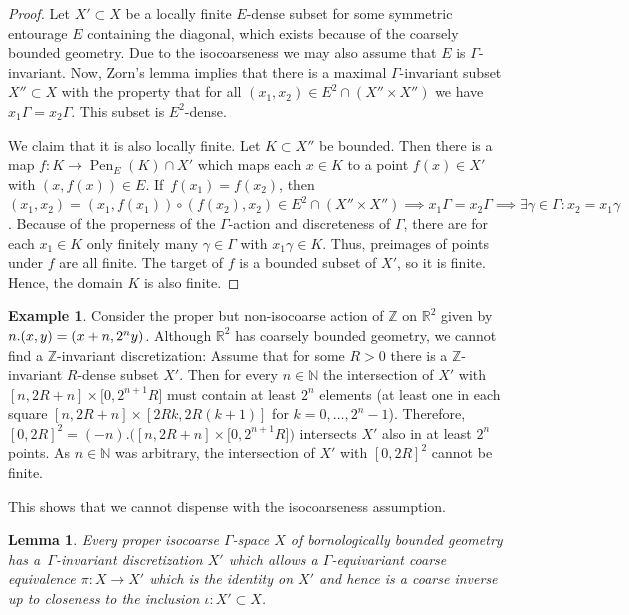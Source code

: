\documentclass[pdftex]{sigma}
\numberwithin{equation}{section}
\newtheorem{lem}[thm]{Lemma}
\theoremstyle{definition}
\newtheorem{Example}[thm]{Example}
\newcommand{\N}{\mathbb{N}}
\newcommand{\Z}{\mathbb{Z}}
\newcommand{\R}{\mathbb{R}}
\DeclareMathOperator{\Pen}{Pen}
\begin{document}
\begin{proof}
Let $X'\subset X$ be a locally finite $E$-dense subset for some symmetric entourage $E$ containing the diagonal, which exists because of the coarsely bounded geometry. Due to the isocoarseness we may also assume that $E$ is $\Gamma$-invariant. Now, Zorn's lemma implies that there is a maximal $\Gamma$-invariant subset $X''\subset X$ with the property that for all $(x_1,x_2)\in E^2\cap(X''\times X'')$ we have $x_1\Gamma=x_2\Gamma$. This subset is $E^2$-dense.

We claim that it is also locally finite. Let $K\subset X''$ be bounded. Then there is a map $f\colon K\to \Pen_E(K)\cap X'$ which maps each $x\in K$ to a point $f(x)\in X'$ with $(x,f(x))\in E$. If~$f(x_1)=f(x_2)$, then $(x_1,x_2)=(x_1,f(x_1))\circ(f(x_2),x_2)\in E^2\cap (X''\times X'')\implies x_1\Gamma=x_2\Gamma\implies \exists \gamma\in \Gamma\colon x_2=x_1\gamma$. Because of the properness of the $\Gamma$-action and discreteness of $\Gamma$, there are for each $x_1\in K$ only finitely many $\gamma\in \Gamma$ with $x_1\gamma\in K$. Thus, preimages of points under $f$ are all finite. The target of $f$ is a bounded subset of $X'$, so it is finite. Hence, the domain $K$ is also finite.
\end{proof}

\begin{Example}
Consider the proper but non-isocoarse action of $\Z$ on $\R^2$ given by $n.(x,y)=\linebreak(x+n, 2^ny)$. Although $\R^2$ has coarsely bounded geometry, we cannot find a $\Z$-invariant discretization: Assume that for some $R>0$ there is a $\Z$-invariant $R$-dense subset $X'$. Then for every $n\in\N$ the intersection of $X'$ with $[n,2R+n]\times\big[0,2^{n+1}R\big]$ must contain at least $2^n$ elements (at least one in each square $[n,2R+n]\times[2Rk,2R(k+1)]$ for $k=0,\dots,2^n-1$). Therefore, $[0,2R]^2=(-n).\big([n,2R+n]\times\big[0,2^{n+1}R\big]\big)$ intersects $X'$ also in at least $2^n$ points. As $n\in\N$ was arbitrary, the intersection of $X'$ with $[0,2R]^2$ cannot be finite.

This shows that we cannot dispense with the isocoarseness assumption.
\end{Example}



\begin{lem}\label{lem:goodequivariantdiscretization}
Every proper isocoarse $\Gamma$-space $X$ of bornologically bounded geometry has a~$\Gamma$-invariant discretization $X'$ which allows a $\Gamma$-equivariant coarse equivalence $\pi\colon X\to X'$ which is the identity on $X'$ and hence is a coarse inverse up to closeness to the inclusion $\iota\colon X'\subset X$.
\end{lem}
\end{document}
